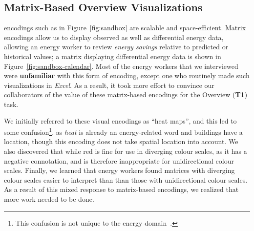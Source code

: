 \documentclass[journal]{vgtc}                %
\newcommand{\bqstart}[1]{\vspace{1mm} \noindent{\textbf{#1}}}
\begin{document}

\subsection{Matrix-Based Overview Visualizations}
\label{design-matrix}




\bqstart{Time series matrix} encodings such as in Figure~\ref{fig:sandbox} are scalable and space-efficient.
Matrix encodings allow us to display observed as well as differential energy data, allowing an energy worker to review {\it energy savings} relative to predicted or historical values; a matrix displaying differential energy data is shown in Figure~\ref{fig:sandbox-calendar}.
Most of the energy workers that we interviewed were {\bf unfamiliar} with this form of encoding, except one who routinely made such visualizations in {\it Excel}. 
As a result, it took more effort to convince our collaborators of the value of these matrix-based encodings for the Overview ({\bf T1}) task.

We initially referred to these visual encodings as ``heat maps'', and this led to some confusion\footnote{This confusion is not unique to the energy domain~\cite{Field2015,Wilkinson2009}.}, as {\it heat} is already an energy-related word and buildings have a location, though this encoding does not take spatial location into account.
We also discovered that while red is fine for use in diverging colour scales, as it has a negative connotation, and is therefore inappropriate for unidirectional colour scales. 
Finally, we learned that energy workers found matrices with diverging colour scales easier to interpret than than those with unidirectional colour scales.
As a result of this mixed response to matrix-based encodings, we realized that more work needed to be done.
\end{document}
